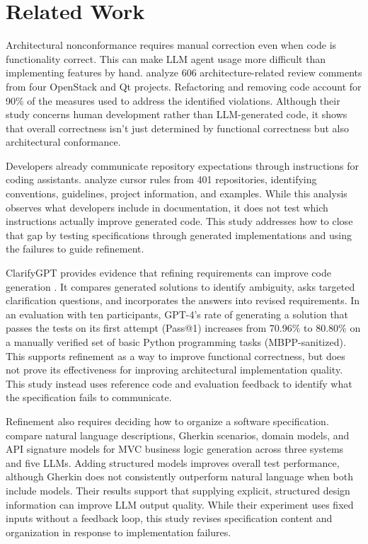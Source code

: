 \documentclass[sigconf,nonacm]{acmart}
\begin{document}
\section{Related Work}

Architectural nonconformance requires manual correction even when code is functionality correct. This can make LLM agent usage more difficult than implementing features by hand. \citet{li2023} analyze 606 architecture-related review comments from four OpenStack and Qt projects. Refactoring and removing code account for 90\% of the measures used to address the identified violations. Although their study concerns human development rather than LLM-generated code, it shows that overall correctness isn't just determined by functional correctness but also architectural conformance.

Developers already communicate repository expectations through instructions for coding assistants. \citet{jiang2025} analyze cursor rules from 401 repositories, identifying conventions, guidelines, project information, and examples. While this analysis observes what developers include in documentation, it does not test which instructions actually improve generated code. This study addresses how to close that gap by testing specifications through generated implementations and using the failures to guide refinement.

ClarifyGPT provides evidence that refining requirements can improve code generation \citep{mu2024}. It compares generated solutions to identify ambiguity, asks targeted clarification questions, and incorporates the answers into revised requirements. In an evaluation with ten participants, GPT-4's rate of generating a solution that passes the tests on its first attempt (Pass@1) increases from 70.96\% to 80.80\% on a manually verified set of basic Python programming tasks (MBPP-sanitized). This supports refinement as a way to improve functional correctness, but does not prove its effectiveness for improving architectural implementation quality. This study instead uses reference code and evaluation feedback to identify what the specification fails to communicate.

Refinement also requires deciding how to organize a software specification. \citet{feng2026} compare natural language descriptions, Gherkin scenarios, domain models, and API signature models for MVC business logic generation across three systems and five LLMs. Adding structured models improves overall test performance, although Gherkin does not consistently outperform natural language when both include models. Their results support that supplying explicit, structured design information can improve LLM output quality. While their experiment uses fixed inputs without a feedback loop, this study revises specification content and organization in response to implementation failures.
\end{document}
